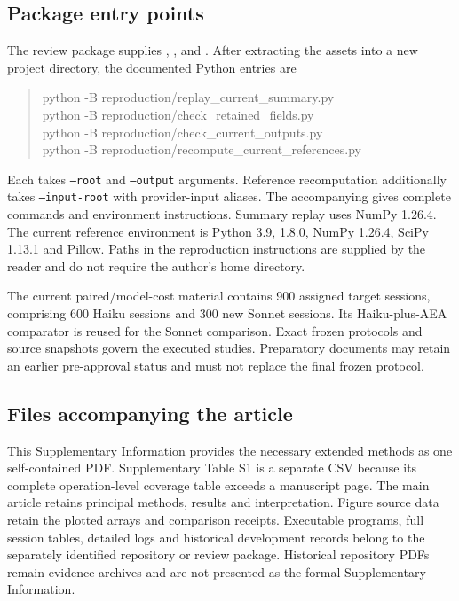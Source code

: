 \subsection*{Package entry points}
The review package supplies , ,  and . After extracting the assets into a new project directory, the documented Python entries are
\begin{quote}\small\ttfamily
python -B reproduction/replay\_current\_summary.py\\
python -B reproduction/check\_retained\_fields.py\\
python -B reproduction/check\_current\_outputs.py\\
python -B reproduction/recompute\_current\_references.py
\end{quote}
Each takes \texttt{--root} and \texttt{--output} arguments. Reference recomputation additionally takes \texttt{--input-root} with provider-input aliases. The accompanying  gives complete commands and environment instructions. Summary replay uses NumPy 1.26.4. The current reference environment is Python 3.9, \mne{} 1.8.0, NumPy 1.26.4, SciPy 1.13.1 and Pillow. Paths in the reproduction instructions are supplied by the reader and do not require the author's home directory.

The current paired/model-cost material contains 900 assigned target sessions, comprising 600 Haiku sessions and 300 new Sonnet sessions. Its Haiku-plus-AEA comparator is reused for the Sonnet comparison. Exact frozen protocols and source snapshots govern the executed studies. Preparatory documents may retain an earlier pre-approval status and must not replace the final frozen protocol.

\subsection*{Files accompanying the article}
This Supplementary Information provides the necessary extended methods as one self-contained PDF. Supplementary Table S1 is a separate CSV because its complete operation-level coverage table exceeds a manuscript page. The main article retains principal methods, results and interpretation. Figure source data retain the plotted arrays and comparison receipts. Executable programs, full session tables, detailed logs and historical development records belong to the separately identified repository or review package. Historical repository PDFs remain evidence archives and are not presented as the formal Supplementary Information.

